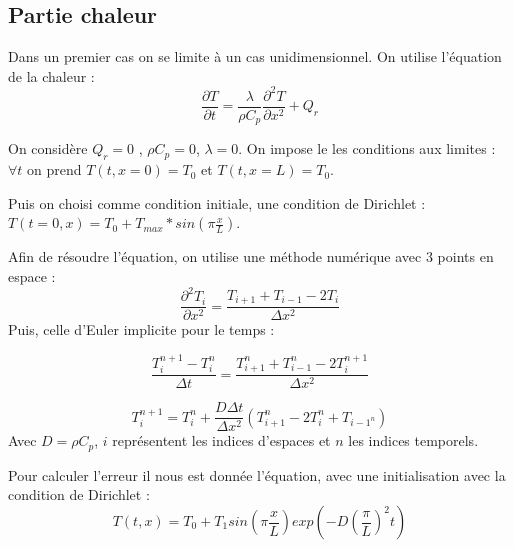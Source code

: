 \documentclass[a4paper,11pt]{article}
\begin{document}
\subsection{Partie chaleur}
Dans un premier cas on se limite à un cas unidimensionnel.
On utilise l'équation de la chaleur : 
\begin{equation}\label{eq:6}
\frac{\partial T}{\partial t} =    \frac{\lambda}{ \rho C_p} \frac{\partial^2 T}{\partial x^2} + Q_r
\end{equation}

On considère $ Q_r = 0$ , $\rho C_p = 0 $, $\lambda = 0$. On impose le les conditions aux limites : $\forall t$ on prend $ T(t, x=0) = T_0$ et $T(t, x=L) = T_0$. \\


Puis on choisi comme condition initiale, une condition de Dirichlet : $T(t=0, x) = T_0 + T_{max}*sin(\pi\frac{x}{L})$.




Afin de résoudre l'équation, on utilise une méthode numérique avec 3 points en espace : 
\begin{equation}\label{eq:7}
    \frac{\partial^2 T_i}{\partial x^2}= \frac{T_{i+1}+T_{i-1}-2T_i}{\Delta x^2}
\end{equation}
Puis, celle d'Euler implicite pour le temps :

$$ \frac{T_i^{n+1}-T_i^n}{\Delta t}= \frac{T_{i+1}^n+T_{i-1}^n-2T_i^{n+1}}{\Delta x^2} $$

\begin{equation}\label{eq:8}
    T_i^{n+1}=T_i^n + \frac{D\Delta t}{\Delta x^2} ( T_{i+1}^n-2T_i^n+T_{i-1^n})
\end{equation}
Avec $D = \rho C_p$, $i$ représentent les indices d'espaces et $n$ les indices temporels.

Pour calculer l'erreur il nous est donnée l'équation, avec une initialisation avec la condition de Dirichlet : 
\begin{equation}
    T(t,x) = T_0 + T_1 sin(\pi\frac{x}{L})exp(-D(\frac{\pi}{L})^2t)
\end{equation}
\end{document}
